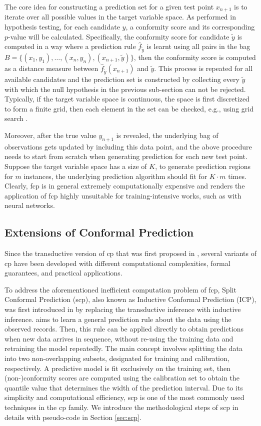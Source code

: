 The core idea for constructing a prediction set for a given test point $x_{n+1}$ is to iterate over all possible values in the target variable space. As performed in hypothesis testing, for each candidate $y$, a conformity score and its corresponding $p$-value will be calculated. Specifically, the conformity score for candidate $\tilde{y}$ is computed in a way where a prediction rule $\hat{f}_{\tilde{y}}$ is learnt using all pairs in the bag \(B = \{(x_1, y_1), \dots, (x_n, y_n), (x_{n+1}, \tilde{y})\}\), then the conformity score is computed as a distance measure between $\hat{f}_{\tilde{y}}(x_{n+1})$ and $\tilde{y}$. This process is repeated for all available candidates and the prediction set is constructed by collecting every $\tilde{y}$ with which the null hypothesis in the previous sub-section can not be rejected. Typically, if the target variable space is continuous, the space is first discretized to form a finite grid, then each element in the set can be checked, e.g., using grid search \cite{angelopoulos2021gentle}.

Moreover, after the true value $y_{n+1}$ is revealed, the underlying bag of observations gets updated by including this data point, and the above procedure needs to start from scratch when generating prediction for each new test point. Suppose the target variable space has a size of $K$, to generate prediction regions for $m$ instances, the underlying prediction algorithm should fit for $K \cdot m$ times. Clearly, \gls{fcp} is in general extremely computationally expensive and renders the application of \gls{fcp} highly unsuitable for training-intensive works, such as with neural networks.

\subsection{Extensions of Conformal Prediction}
Since the transductive version of \gls{cp} that was first proposed in \cite{gammerman1998learning}, several variants of \gls{cp} have been developed with different computational complexities, formal guarantees, and practical applications.

To address the aforementioned inefficient computation problem of \gls{fcp}, Split Conformal Prediction (\gls{scp}), also known as Inductive Conformal Prediction (ICP), was first introduced in \cite{papadopoulos2002inductive} by replacing the transductive inference with inductive inference.  aims to learn a general prediction rule about the data using the observed records. Then, this rule can be applied directly to obtain predictions when new data arrives in sequence, without re-using the training data and retraining the model repeatedly. The main concept involves splitting the data into two non-overlapping subsets, designated for training and calibration, respectively. A predictive model is fit exclusively on the training set, then (non-)conformity scores are computed using the calibration set to obtain the quantile value that determines the width of the prediction interval. Due to its simplicity and computational efficiency, \gls{scp} is one of the most commonly used techniques in the \gls{cp} family. We introduce the methodological steps of \gls{scp} in details with pseudo-code in Section \ref{sec:scp}.

